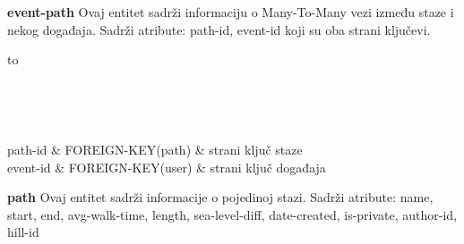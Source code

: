 			\textbf{event-path} Ovaj entitet sadrži informaciju o Many-To-Many vezi između staze i nekog događaja. Sadrži atribute: path-id, event-id koji su oba strani ključevi.
			
			\begin{longtabu} to \textwidth {|X[6, l]|X[6, l]|X[20, l]|}
				
				\hline {}	 \\[3pt] \hline
				\endfirsthead
				
				\hline {}	 \\[3pt] \hline
				\endhead
				
				\hline 
				\endlastfoot
				
				path-id & FOREIGN-KEY(path)	&  	strani ključ staze 	\\ \hline
				event-id	& FOREIGN-KEY(user) &  strani ključ događaja 	\\ \hline 
				
				
			\end{longtabu}
			\vspace{10mm}

			\textbf{path} Ovaj entitet sadrži informacije o pojedinoj stazi. Sadrži atribute: name, start, end, avg-walk-time, length, sea-level-diff, date-created, is-private, author-id, hill-id
			
